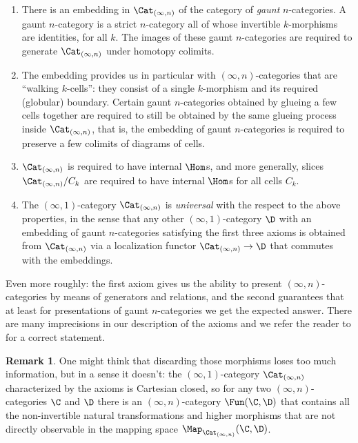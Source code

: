 \documentclass[12pt]{amsart}
\theoremstyle{definition} \newtheorem{definition}[theorem]{Definition}
\newtheorem{remark}[theorem]{Remark}
\numberwithin{equation}{section}
\newcommand{\oo}{\infty}
\newcommand{\io}{$(\oo,1)$}
\newcommand{\Catin}{\Cat_{(\oo,n)}}
\begin{document}
\begin{enumerate}
  \item There is an embedding in $\Catin$ of the category of
    \emph{gaunt} $n$-categories. A gaunt $n$-category is a strict
    $n$-category all of whose invertible $k$-morphisms are identities,
    for all $k$. The images of these gaunt $n$-categories are
    required to generate $\Catin$ under homotopy colimits.
  \item The embedding provides us in particular with
    $(\oo,n)$-categories that are ``walking $k$-cells'': they consist
    of a single $k$-morphism and its required (globular) boundary.
    Certain gaunt $n$-categories obtained by glueing a few cells
    together are required to still be obtained by the same glueing
    process inside $\Catin$, that is, the embedding of gaunt
    $n$-categories is required to preserve a few colimits of diagrams
    of cells.
  \item $\Catin$ is required to have internal $\Hom$s, and more
    generally, slices $\Catin/C_k$ are required to have internal
    $\Hom$s for all cells $C_k$.
  \item The \io-category $\Catin$ is \emph{universal} with the respect
    to the above properties, in the sense that any other \io-category
    $\D$ with an embedding of gaunt $n$-categories satisfying the first
    three axioms is obtained from $\Catin$ via a localization functor
    $\Catin \to \D$ that commutes with the embeddings.
\end{enumerate}

Even more roughly: the first axiom gives us the ability to present
$(\oo,n)$-categories by means of generators and relations, and the
second guarantees that at least for presentations of gaunt
$n$-categories we get the expected answer. There are many imprecisions
in our description of the axioms and we refer the reader to
\cite{ClarkChris} for a correct statement.

\begin{remark}
  One might think that discarding those morphisms loses too much
  information, but in a sense it doesn't: the \io-category
  $\Catin$ characterized by the axioms is Cartesian closed, so
  for any two $(\oo,n)$-categories $\C$ and $\D$ there is an
  $(\oo,n)$-category $\Fun(\C,\D)$ that contains all the non-invertible
  natural transformations and higher morphisms that are not directly
  observable in the mapping space $\Map_{\Catin}(\C,\D)$.
\end{remark}
\end{document}
